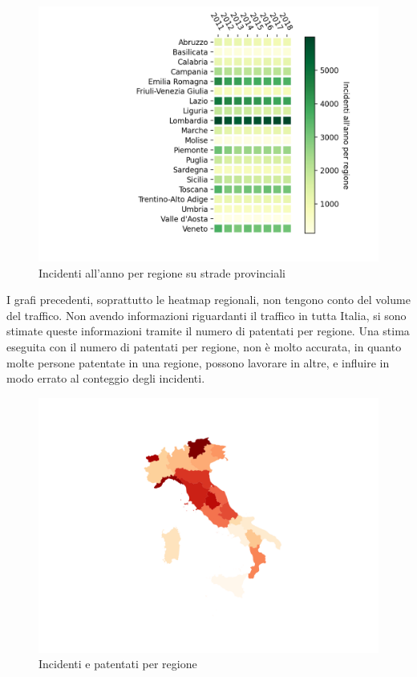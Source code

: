 \documentclass[a4paper]{report}
\begin{document}
\begin{figure}
    \includegraphics[width=\linewidth]{../src/incidenti/incidenti_aci/mappe_regioni/regioni_heatmap.png}
    \caption{Incidenti all'anno per regione su strade provinciali}
    \label{fig:regione-heatmap}
\end{figure}

I grafi precedenti, soprattutto le heatmap regionali, non tengono conto del volume del 
traffico.
Non avendo informazioni riguardanti il traffico in tutta Italia, si sono stimate 
queste informazioni tramite il numero di patentati per regione.
Una stima eseguita con il numero di patentati per regione, non è molto accurata, 
in quanto molte persone patentate in una regione, possono lavorare in altre, e influire 
in modo errato al conteggio degli incidenti. 

\begin{figure}
    \includegraphics[width=\linewidth]{../src/incidenti/incidenti_aci/mappe_regioni/incidenti_patenti_italia.png}
    \caption{Incidenti e patentati per regione}
    \label{fig:incidenti-patentati}
\end{figure}
\end{document}
